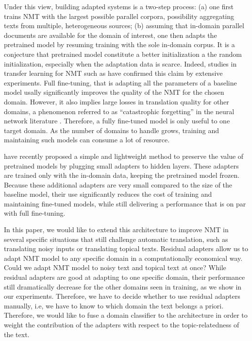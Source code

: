 \documentclass[11pt,a4paper]{article}
\newcommand{\fyTodo}[1]{\Todo[FY:]{\textcolor{orange}{#1}}}
\begin{document}
Under this view, building adapted systems is a two-step process: (a) one first trains NMT with the largest possible parallel corpora, possibility aggregating texts from multiple, heterogeneous sources; (b) assuming that in-domain parallel documents are available for the domain of interest, one then adapts the pretrained model by resuming training with the sole in-domain corpus. It is a conjecture that pretrained model constitute a better initialization a the random initialization, especially when the adaptation data is scarce. Indeed, studies in transfer learning for NMT such as \cite{artetxe20cross,aji20neural} have confirmed this claim by extensive experiments. Full fine-tuning, that is adapting all the parameters of a baseline model usally significantly improves the quality of the NMT for the chosen domain. However, it also implies large losses in translation quality for other domains, a phenomenon referred to as ``catastrophic forgetting'' in the neural network literature \cite{McCloskey89catastrophic}. Therefore, a fully fine-tuned model is only useful to one target domain. As the number of domains to handle grows, training and maintaining such models can consume a lot of resource.\fyTodo{Fix this sentence}

\cite{Vilar18learning,bapna19simple} have recently proposed a simple and lightweight method to preserve the value of pretrained models by plugging small adapters to hidden layers. These adapters are trained only with the in-domain data, keeping the pretrained model frozen. Because these additional adapters are very small compared to the size of the baseline model, their use significantly reduces the cost of training and maintaining fine-tuned models, while still delivering a performance that is on par with full fine-tuning.

In this paper, we would like to extend this architecture to improve NMT in several specific situations that still challenge automatic translation, such as translating noisy inputs or translating topical texts\fyTodo{??}. Residual adapters allow us to adapt NMT model to any specific domain in a computationally economical way. Could we adapt NMT model to noisy text and topical text at once? While residual adapters are good at adapting to one specific domain, their performance still dramatically decrease for the other domains seen in training, as we show in our experiments. Therefore, we have to decide whether to use residual adapters manually, i.e, we have to know to which domain the text belongs a priori. Therefore, we would like to fuse a domain classifier to the architecture in order to weight the contribution of the adapters with respect to the topic-relatedness of the text.\fyTodo{Say differently: various implementations}
\end{document}
